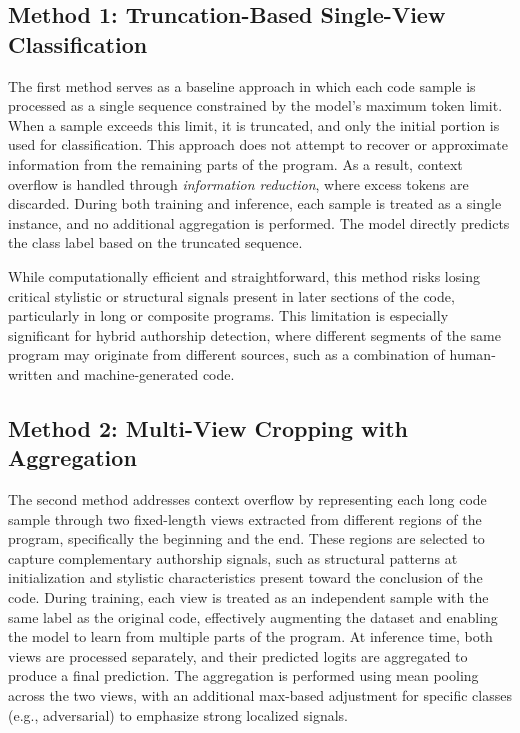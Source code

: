 \documentclass[conference]{IEEEtran}
\begin{document}
\subsection{Method 1: Truncation-Based Single-View Classification}

The first method serves as a baseline approach in which each code sample is processed as a single sequence constrained by the model's maximum token limit. When a sample exceeds this limit, it is truncated, and only the initial portion is used for classification. This approach does not attempt to recover or approximate information from the remaining parts of the program. As a result, context overflow is handled through \textit{information reduction}, where excess tokens are discarded. During both training and inference, each sample is treated as a single instance, and no additional aggregation is performed. The model directly predicts the class label based on the truncated sequence. 

While computationally efficient and straightforward, this method risks losing critical stylistic or structural signals present in later sections of the code, particularly in long or composite programs. This limitation is especially significant for hybrid authorship detection, where different segments of the same program may originate from different sources, such as a combination of human-written and machine-generated code.

\subsection{Method 2: Multi-View Cropping with Aggregation}

The second method addresses context overflow by representing each long code sample through two fixed-length views extracted from different regions of the program, specifically the beginning and the end. These regions are selected to capture complementary authorship signals, such as structural patterns at initialization and stylistic characteristics present toward the conclusion of the code. During training, each view is treated as an independent sample with the same label as the original code, effectively augmenting the dataset and enabling the model to learn from multiple parts of the program. At inference time, both views are processed separately, and their predicted logits are aggregated to produce a final prediction. The aggregation is performed using mean pooling across the two views, with an additional max-based adjustment for specific classes (e.g., adversarial) to emphasize strong localized signals.
\end{document}
